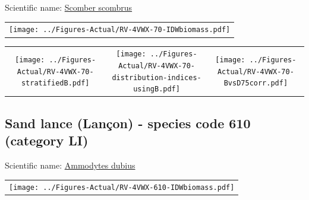 \documentclass[12pt]{article}\usepackage[]{graphicx}\usepackage[]{color}
\begin{document}
  


Scientific name: \href{http://www.marinespecies.org/aphia.php?p=taxdetails\&id=127023}{Scomber scombrus} \newline
\begin{minipage}{1.0\textwidth}
 \begin{tabular}{c}
\texttt{[image: ../Figures-Actual/RV-4VWX-70-IDWbiomass.pdf]} \\ 
\end{tabular} 
\end{minipage}
\newline

\vspace{1cm}
\begin{minipage}{1.0\textwidth}
 \begin{tabular}{ccc}
\texttt{[image: ../Figures-Actual/RV-4VWX-70-stratifiedB.pdf]} & 
\texttt{[image: ../Figures-Actual/RV-4VWX-70-distribution-indices-usingB.pdf]} & 
\texttt{[image: ../Figures-Actual/RV-4VWX-70-BvsD75corr.pdf]} \\ 
\end{tabular} 
\end{minipage}
\clearpage

\renewcommand\thefigure{\thesubsection\Alph{figure}}

\setcounter{figure}{0}

\hypertarget{sec:610}{%
\subsection{Sand lance (Lançon) - species code 610 (category LI)}\label{sec:610}}

  


Scientific name: \href{http://www.marinespecies.org/aphia.php?p=taxdetails\&id=151520}{Ammodytes dubius} \newline
\begin{minipage}{1.0\textwidth}
 \begin{tabular}{c}
\texttt{[image: ../Figures-Actual/RV-4VWX-610-IDWbiomass.pdf]} \\ 
\end{tabular} 
\end{minipage}
\newline
\end{document}
